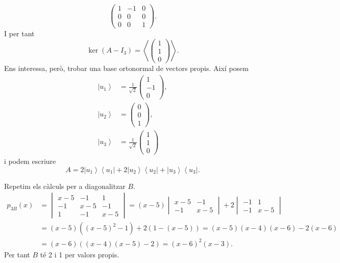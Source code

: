 \documentclass[12pt]{article}
\numberwithin{table}{section}
\numberwithin{figure}{section}
\numberwithin{equation}{section}
\newcommand{\ket}[1]{\left\lvert #1 \right\rangle}
\newcommand{\bra}[1]{\left\langle #1 \right\rvert}
\begin{document}
\begin{enumerate}[label=(\alph*), font=\bfseries \sffamily, wide, labelwidth=!, labelindent=0pt]
\begin{equation*}
			\begin{pmatrix}
				1 & -1 & 0 \\
				0 & 0 & 0 \\
				0 & 0 & 1 
			\end{pmatrix}.
		\end{equation*}
		I per tant 
		\begin{equation*}
			\ker{(A - I_3)} = \left\langle \begin{pmatrix}
					1 \\ 1 \\0
			\end{pmatrix} \right\rangle.
		\end{equation*}
		Ens interessa, però, trobar una base ortonormal de vectors propis. Així posem
		\begin{align*}
			\ket{u_1} & = \frac{1}{\sqrt{2}}\begin{pmatrix}
				1\\-1\\0
			\end{pmatrix}, \\
			\ket{u_2} & = \begin{pmatrix}
				0\\0\\1
			\end{pmatrix}, \\
			\ket{u_3} & = \frac{1}{\sqrt{2}}\begin{pmatrix}
				1\\1\\0
			\end{pmatrix}
		\end{align*}
		i podem escriure
		\begin{equation*}
			A = 2\ket{u_1}\bra{u_1} + 2\ket{u_2}\bra{u_2} + \ket{u_3}\bra{u_3}.
		\end{equation*}

		Repetim els càlculs per a diagonalitzar \( B \).
		\begin{align*}
			p_{3B}(x) & = \begin{vmatrix}
				x-5 & -1 & 1 \\
				-1 & x-5 & -1 \\
				1 & -1 & x-5
				\end{vmatrix} = (x-5) \begin{vmatrix}
				x-5 & -1 \\
				-1 & x-5
				\end{vmatrix} + 2 \begin{vmatrix}
				-1 & 1 \\
				-1 & x-5
			\end{vmatrix} \\
			& = (x-5) \left((x-5)^2 - 1\right) + 2(1 - (x-5)) = (x-5)(x-4)(x-6) - 2(x-6) \\
			& = (x-6)((x-4)(x-5) - 2) = (x-6)^2(x-3).
		\end{align*}
		Per tant \( B \) té 2 i 1 per valors propis. 


\end{enumerate}
\end{document}
